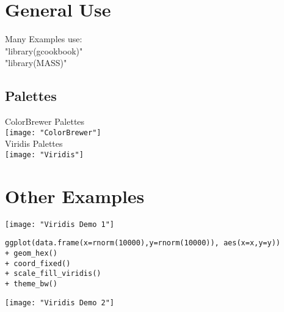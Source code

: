 \documentclass[]{article}
\begin{document}
\section{General Use}

Many Examples use: \\
"library(gcookbook)" \\
"library(MASS)" \\

\subsection{Palettes}
ColorBrewer Palettes \\
\texttt{[image: "ColorBrewer"]} \\
Viridis Palettes \\
\texttt{[image: "Viridis"]} \\

\section{Other Examples}
\texttt{[image: "Viridis Demo 1"]} \\
\begin{verbatim}
ggplot(data.frame(x=rnorm(10000),y=rnorm(10000)), aes(x=x,y=y)) 
+ geom_hex() 
+ coord_fixed() 
+ scale_fill_viridis() 
+ theme_bw()
\end{verbatim}

\texttt{[image: "Viridis Demo 2"]} \\
\inputminted[]{r}{"Viridis Map Demo.rhistory"}
\end{document}

